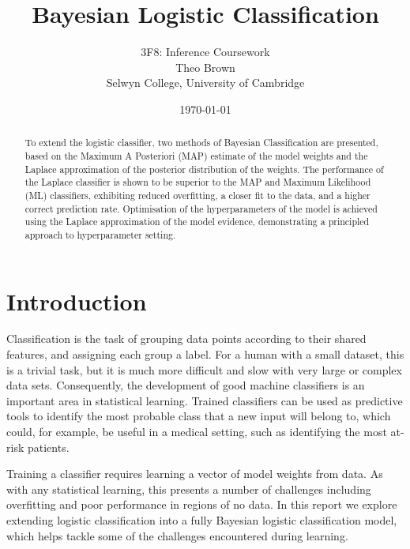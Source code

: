 \documentclass[a4paper]{article}
\begin{document}
    \title{Bayesian Logistic Classification}
    \author{3F8: Inference Coursework \\ Theo Brown \\ Selwyn College, University of Cambridge}
    \date{\today}
    \maketitle

    \begin{abstract}
        To extend the logistic classifier, two methods of Bayesian Classification are presented, based on the Maximum A Posteriori (MAP) estimate of the model weights and the Laplace approximation of the posterior distribution of the weights.
        The performance of the Laplace classifier is shown to be superior to the MAP and Maximum Likelihood (ML) classifiers, exhibiting reduced overfitting, a closer fit to the data, and a higher correct prediction rate.
        Optimisation of the hyperparameters of the model is achieved using the Laplace approximation of the model evidence, demonstrating a principled approach to hyperparameter setting.
    \end{abstract}

    \tableofcontents

    \section{Introduction}\label{sec:introduction}
    Classification is the task of grouping data points according to their shared features, and assigning each group a label.
    For a human with a small dataset, this is a trivial task, but it is much more difficult and slow with very large or complex data sets.
    Consequently, the development of good machine classifiers is an important area in statistical learning.
    Trained classifiers can be used as predictive tools to identify the most probable class that a new input will belong to, which could, for example, be useful in a medical setting, such as identifying the most at-risk patients.

    Training a classifier requires learning a vector of model weights from data.
    As with any statistical learning, this presents a number of challenges including overfitting and poor performance in regions of no data.
    In this report we explore extending logistic classification into a fully Bayesian logistic classification model, which helps tackle some of the challenges encountered during learning.
\end{document}
